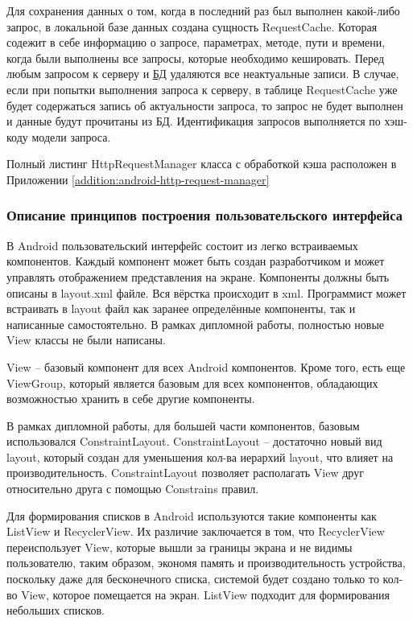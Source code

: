 Для сохранения данных о том, когда в последний раз был выполнен какой-либо запрос, в локальной базе данных создана сущность RequestCache.
Которая содежит в себе информацию о запросе, параметрах, методе, пути и времени, когда были выполнены все запросы, которые необходимо кешировать.
Перед любым запросом к серверу и \hyperlink{gloss:db}{БД} удаляются все неактуальные записи.
В случае, если при попытки выполнения запроса к серверу, в таблице RequestCache уже будет содержаться запись об актуальности запроса, то запрос не будет выполнен и данные будут прочитаны из БД.
Идентификация запросов выполняется по хэш-коду модели запроса.

Полный листинг HttpRequestManager класса с обработкой кэша расположен в Приложении \ref{addition:android-http-request-manager}

\subsubsection{Описание принципов построения пользовательского интерфейса}\indent

В Android пользовательский интерфейс состоит из легко встраиваемых компонентов.
Каждый компонент может быть создан разработчиком и может управлять отображением представления на экране.
Компоненты должны быть описаны в layout.xml файле.
Вся вёрстка происходит в xml.
Программист может встраивать в layout файл как заранее определённые компоненты, так и написанные самостоятельно.
В рамках дипломной работы, полностью новые View классы не были написаны.

View – базовый компонент для всех Android компонентов.
Кроме того, есть еще ViewGroup, который является базовым для всех компонентов, обладающих возможностью хранить в себе другие компоненты.

В рамках дипломной работы, для большей части компонентов, базовым использовался ConstraintLayout.
ConstraintLayout – достаточно новый вид layout, который создан для уменьшения кол-ва иерархий layout, что влияет на производительность.
ConstraintLayout позволяет располагать View друг относительно друга с помощью Constrains правил.

Для формирования списков в Android используются такие компоненты как ListView и RecyclerView.
Их различие заключается в том, что RecyclerView переиспользует View, которые вышли за границы экрана и не видимы пользователю, таким образом, экономя память и производительность устройства, поскольку даже для бесконечного списка, системой будет создано только то кол-во View, которое помещается на экран.
ListView подходит для формирования небольших списков.

